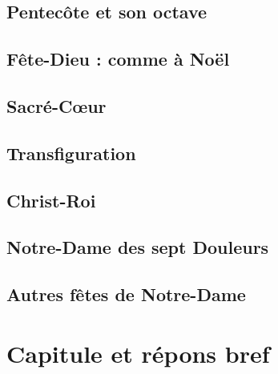 \documentclass[%
a6paper%
,fontsize=8pt%
,DIV=13%
,titlepage=on%
,headings=optiontoheadandtoc%
,headings=small%
,parskip=false%
]{scrbook}
\begin{document}

\section{Pentecôte et son octave}\paginarectavacua


\section*{Fête-Dieu : comme à Noël}\paginarectavacua

\section{Sacré-Cœur}\paginarectavacua


\section{Transfiguration}\paginarectavacua


\section{Christ-Roi}\paginarectavacua


\section{Notre-Dame des sept Douleurs}\paginarectavacua


\section[Fêtes de la sainte Vierge]{Autres fêtes de Notre-Dame}\paginarectavacua




\chapter{Capitule et répons bref}
\end{document}
